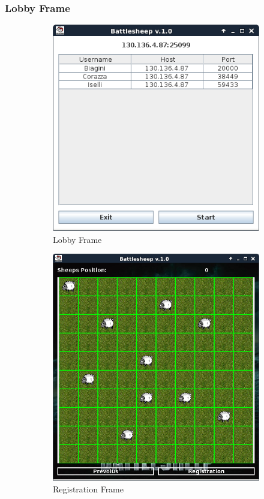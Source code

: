 \subsubsection{Lobby Frame}
\begin{figure}[!h]
	\begin{subfigure}{0.5\textwidth}
		\centering
		\includegraphics[scale=0.4]{core/imgs/gui/lobby_frame}
		\caption{Lobby Frame}
		\label{figure:lobby_frame}
	\end{subfigure}
	\begin{subfigure}{.5\textwidth}
		\centering
		\includegraphics[scale=0.3]{core/imgs/gui/registration_frame}
		\caption{Registration Frame}
		\label{figure:registration_frame}
	\end{subfigure}
	\caption{}
\end{figure}

